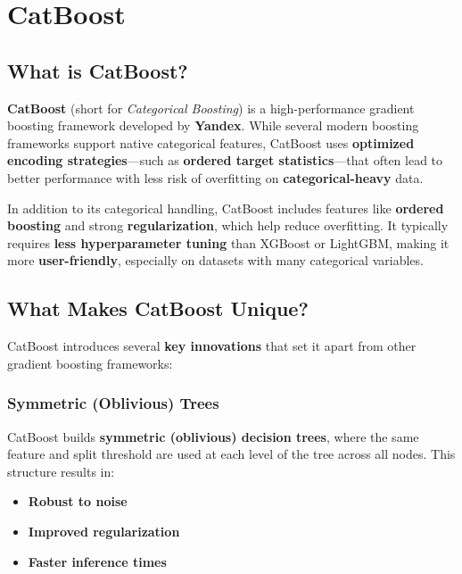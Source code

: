 \documentclass[
  letterpaper,
  DIV=11,
  numbers=noendperiod]{scrreprt}
\providecommand{\tightlist}{%
  \setlength{\itemsep}{0pt}\setlength{\parskip}{0pt}}\usepackage{longtable,booktabs,array}
\begin{document}
\section{CatBoost}\label{catboost}

\subsection{What is CatBoost?}\label{what-is-catboost}

\textbf{CatBoost} (short for \emph{Categorical Boosting}) is a
high-performance gradient boosting framework developed by
\textbf{Yandex}. While several modern boosting frameworks support native
categorical features, CatBoost uses \textbf{optimized encoding
strategies}---such as \textbf{ordered target statistics}---that often
lead to better performance with less risk of overfitting on
\textbf{categorical-heavy} data.

In addition to its categorical handling, CatBoost includes features like
\textbf{ordered boosting} and strong \textbf{regularization}, which help
reduce overfitting. It typically requires \textbf{less hyperparameter
tuning} than XGBoost or LightGBM, making it more \textbf{user-friendly},
especially on datasets with many categorical variables.

\subsection{What Makes CatBoost
Unique?}\label{what-makes-catboost-unique}

CatBoost introduces several \textbf{key innovations} that set it apart
from other gradient boosting frameworks:

\subsubsection{Symmetric (Oblivious)
Trees}\label{symmetric-oblivious-trees}

CatBoost builds \textbf{symmetric (oblivious) decision trees}, where the
same feature and split threshold are used at each level of the tree
across all nodes. This structure results in:

\begin{itemize}
\tightlist
\item
  \textbf{Robust to noise}
\item
  \textbf{Improved regularization}
\item
  \textbf{Faster inference times}
\end{itemize}
\end{document}
